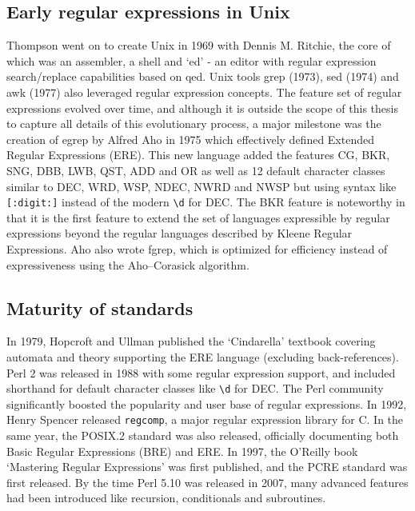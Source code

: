 \subsection{Early regular expressions in Unix}
Thompson went on to create Unix in 1969 with Dennis M. Ritchie, the core of which was an assembler, a shell and `ed' - an editor with regular expression search/replace capabilities based on qed.  Unix tools grep (1973), sed (1974) and awk (1977) also leveraged regular expression concepts.  The feature set of regular expressions evolved over time, and although it is outside the scope of this thesis to capture all details of this evolutionary process, a major milestone was the creation of egrep by Alfred Aho in 1975 which effectively defined Extended Regular Expressions (ERE).  This new language added the features CG, BKR, SNG, DBB, LWB, QST, ADD and OR as well as 12 default character classes similar to DEC, WRD, WSP, NDEC, NWRD and NWSP but using syntax like \verb![:digit:]! instead of the modern \verb!\d! for DEC.  The BKR feature is noteworthy in that it is the first feature to extend the set of languages expressible by regular expressions beyond the regular languages described by Kleene Regular Expressions. Aho also wrote fgrep, which is optimized for efficiency instead of expressiveness using the Aho–Corasick algorithm.

\subsection{Maturity of standards}
In 1979, Hopcroft and Ullman published the `Cindarella' textbook covering automata and theory supporting the ERE language (excluding back-references).  Perl 2 was released in 1988 with some regular expression support, and included shorthand for default character classes like \verb!\d! for DEC.  The Perl community significantly boosted the popularity and user base of regular expressions.  In 1992, Henry Spencer released {\tt regcomp}, a major regular expression library for C.  In the same year, the POSIX.2 standard was also released, officially documenting both Basic Regular Expressions (BRE) and ERE.  In 1997, the O'Reilly book `Mastering Regular Expressions' was first published, and the PCRE standard was first released.  By the time Perl 5.10 was released in 2007, many advanced features had been introduced like recursion, conditionals and subroutines.
